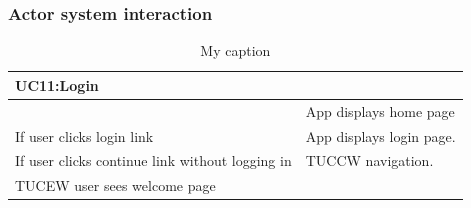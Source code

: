 \documentclass[11pt]{article}
\begin{document}
		\subsubsection{Actor system interaction}
		\begin{table}[ht!]
		\centering
		\caption{My caption}
		\label{my-label}
		\begin{tabular}{|l|l|}
		\hline
		\textbf{UC11:Login}                             & \textbf{}                \\ \hline
								& App displays home page   \\ \hline
		If user clicks login link                       & App displays login page. \\ \hline
		If user clicks continue link without logging in & TUCCW navigation.        \\ \hline
		TUCEW user sees welcome page                    &                          \\ \hline
		\end{tabular}
		\end{table}
		
\end{document}

